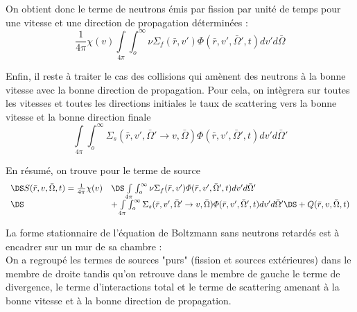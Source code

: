 On obtient donc le terme de neutrons émis par fission par unité de temps pour une vitesse et une
direction de propagation déterminées :
\begin{equation}
\frac{1}{{4\pi }}\chi (v) \int\limits_{4\pi }    \int_o^\infty     \nu {\Sigma _f}(\bar r,v')\varPhi (\bar r,v',\bar \Omega ',t)dv'd\bar \Omega 
\end{equation}


Enfin, il reste à traiter le cas des collisions qui amènent des neutrons à la bonne vitesse avec la
bonne direction de propagation. Pour cela, on intègrera sur toutes les vitesses et toutes les directions initiales
le taux de scattering vers la bonne vitesse et la bonne direction finale
\begin{equation}
\int\limits_{4\pi }    \int_o^\infty     {\Sigma _s}(\bar r,v',\bar \Omega ' \to v,\bar \Omega )\varPhi (\bar r,v',\bar \Omega ',t)dv'd\bar \Omega '
\end{equation}

En résumé, on trouve pour le terme de source
\begin{equation}
\begin{array}{ll}
\DS S(\bar r,v,\bar \Omega ,t) = \frac{1}{{4\pi }}\chi (v)&\DS\int\limits_{4\pi }    \int_o^\infty     \nu {\Sigma _f}(\bar r,v')\varPhi (\bar r,v',\bar \Omega ',t)dv'd\bar \Omega '\\ \DS& +
\int\limits_{4\pi }    \int_o^\infty     {\Sigma _s}(\bar r,v',\bar \Omega ' \to v,\bar \Omega )\varPhi (\bar r,v',\bar \Omega ',t)dv'd\bar \Omega ' \DS+ Q(\bar r,v,\bar \Omega ,t)
\end{array}
\end{equation}

La forme stationnaire de l'équation de Boltzmann sans neutrons retardés 
est à encadrer sur un mur de sa chambre :\\

On a regroupé les termes de sources "purs" (fission et sources extérieures) dans le membre de droite
tandis qu'on retrouve dans le membre de gauche le terme de divergence, le terme d'interactions total
et le terme de scattering amenant à la bonne vitesse et à la bonne direction de propagation.\ \\

